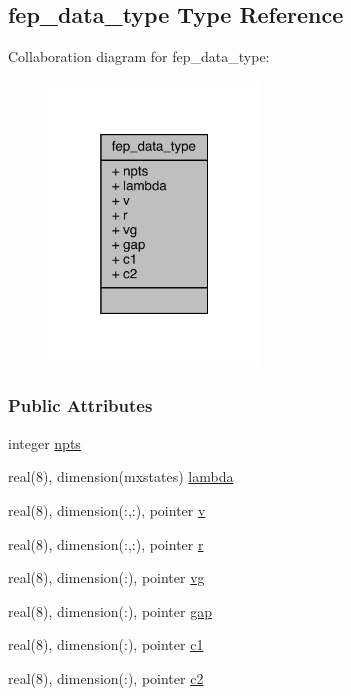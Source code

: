 \hypertarget{structfep__data__type}{\subsection{fep\-\_\-data\-\_\-type Type Reference}
\label{structfep__data__type}
}


Collaboration diagram for fep\-\_\-data\-\_\-type\-:
\nopagebreak
\begin{figure}[H]
\begin{center}
\leavevmode
\includegraphics[width=160pt]{structfep__data__type__coll__graph}
\end{center}
\end{figure}
\subsubsection*{Public Attributes}
\begin{DoxyCompactItemize}
\item 
integer \hyperlink{structfep__data__type_a6fb147378c618fed80fb6fe1c3449e7c}{npts}
\item 
real(8), dimension(mxstates) \hyperlink{structfep__data__type_a01e2321f020c7f795ae893e14ffce055}{lambda}
\item 
real(8), dimension(\-:,\-:), pointer \hyperlink{structfep__data__type_a16f99471c659ed557932977a16294611}{v}
\item 
real(8), dimension(\-:,\-:), pointer \hyperlink{structfep__data__type_a85a22cc6dc5586b9894f876b1949bd2c}{r}
\item 
real(8), dimension(\-:), pointer \hyperlink{structfep__data__type_a3fd66676e42d2d853dece6db591ad19d}{vg}
\item 
real(8), dimension(\-:), pointer \hyperlink{structfep__data__type_a21c600fd6d73ea490f80a3bc2014affb}{gap}
\item 
real(8), dimension(\-:), pointer \hyperlink{structfep__data__type_a7e3bfc946205d5123cff9b4329deafda}{c1}
\item 
real(8), dimension(\-:), pointer \hyperlink{structfep__data__type_a4a8e0e86a443a933c2bd95aa45ad66cb}{c2}
\end{DoxyCompactItemize}



